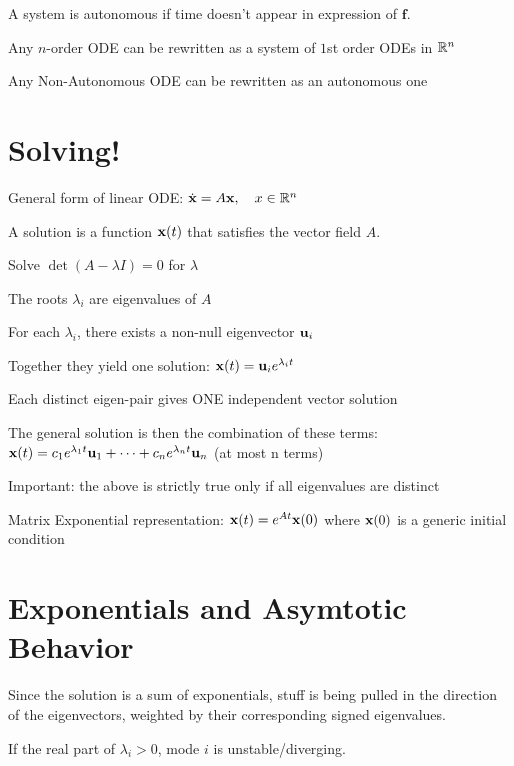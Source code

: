 A system is autonomous if time doesn't appear in expression of $\mathbf{f}$.

\begin{tightitemize}
    \item Any $n$-order ODE can be rewritten as a system of $1$st order ODEs in $\mathbb{R}^n$
    \item Any Non-Autonomous ODE can be rewritten as an autonomous one
\end{tightitemize}

\section*{Solving!}

General form of linear ODE:
$
\dot{\mathbf{x}} = A \mathbf{x}, \quad x \in \mathbb{R}^n
$

A solution is a function $\mathbf{x}(t)$ that satisfies the vector field $A$.

\begin{tightitemize}
    \item Solve $\det(A - \lambda I) = 0$ for $\lambda$
    \item The roots $\lambda_i$ are eigenvalues of $A$
    \item For each $\lambda_i$, there exists a non-null eigenvector
    $\mathbf{u}_i$
    \item Together they yield one solution: $\mathbf{x}(t) = \mathbf{u}_i e^{\lambda_i t}$
    \item Each distinct eigen-pair gives ONE independent vector solution
    \item The general solution is then the combination of these terms:
    $\mathbf{x}(t) = c_1 e^{\lambda_1 t} \mathbf{u}_1 + \dots + c_n e^{\lambda_n t} \mathbf{u}_n$ (at most n terms)
\end{tightitemize}

Important: the above is strictly true only if all eigenvalues are distinct

Matrix Exponential representation: $\mathbf{x}(t) = e^{A t} \mathbf{x}(0)$ where $\mathbf{x}(0)$ is a generic initial condition

\section*{Exponentials and Asymtotic Behavior}

Since the solution is a sum of exponentials, stuff is being pulled in the direction of the eigenvectors,
weighted by their corresponding signed eigenvalues.


If the real part of $\lambda_i > 0$, mode $i$ is unstable/diverging.

